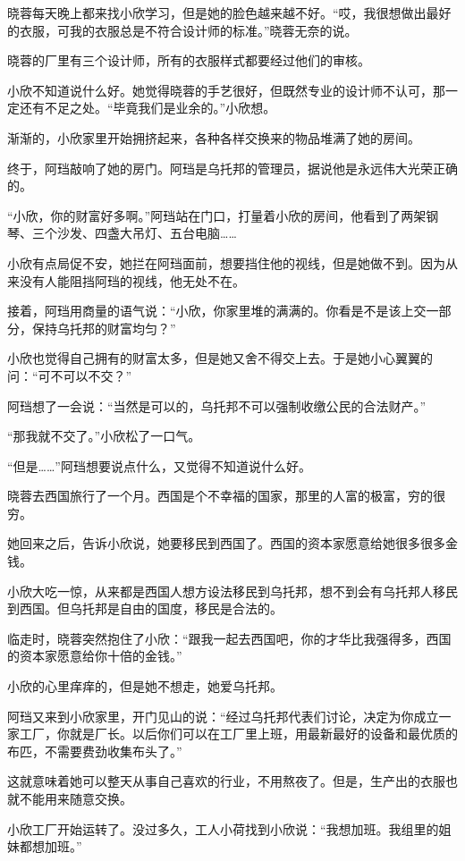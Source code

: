 晓蓉每天晚上都来找小欣学习，但是她的脸色越来越不好。“哎，我很想做出最好的衣服，可我的衣服总是不符合设计师的标准。”晓蓉无奈的说。

晓蓉的厂里有三个设计师，所有的衣服样式都要经过他们的审核。

小欣不知道说什么好。她觉得晓蓉的手艺很好，但既然专业的设计师不认可，那一定还有不足之处。“毕竟我们是业余的。”小欣想。

\zPar
渐渐的，小欣家里开始拥挤起来，各种各样交换来的物品堆满了她的房间。

终于，阿珰敲响了她的房门。阿珰是乌托邦的管理员，据说他是永远伟大光荣正确的。

“小欣，你的财富好多啊。”阿珰站在门口，打量着小欣的房间，他看到了两架钢琴、三个沙发、四盏大吊灯、五台电脑……

小欣有点局促不安，她拦在阿珰面前，想要挡住他的视线，但是她做不到。因为从来没有人能阻挡阿珰的视线，他无处不在。

接着，阿珰用商量的语气说：“小欣，你家里堆的满满的。你看是不是该上交一部分，保持乌托邦的财富均匀？”

小欣也觉得自己拥有的财富太多，但是她又舍不得交上去。于是她小心翼翼的问：“可不可以不交？”

阿珰想了一会说：“当然是可以的，乌托邦不可以强制收缴公民的合法财产。”

“那我就不交了。”小欣松了一口气。

“但是……”阿珰想要说点什么，又觉得不知道说什么好。

\zPar
晓蓉去西国旅行了一个月。西国是个不幸福的国家，那里的人富的极富，穷的很穷。

她回来之后，告诉小欣说，她要移民到西国了。西国的资本家愿意给她很多很多金钱。

小欣大吃一惊，从来都是西国人想方设法移民到乌托邦，想不到会有乌托邦人移民到西国。但乌托邦是自由的国度，移民是合法的。

临走时，晓蓉突然抱住了小欣：“跟我一起去西国吧，你的才华比我强得多，西国的资本家愿意给你十倍的金钱。”

小欣的心里痒痒的，但是她不想走，她爱乌托邦。

\zPar
阿珰又来到小欣家里，开门见山的说：“经过乌托邦代表们讨论，决定为你成立一家工厂，你就是厂长。以后你们可以在工厂里上班，用最新最好的设备和最优质的布匹，不需要费劲收集布头了。”

这就意味着她可以整天从事自己喜欢的行业，不用熬夜了。但是，生产出的衣服也就不能用来随意交换。

小欣工厂开始运转了。没过多久，工人小荷找到小欣说：“我想加班。我组里的姐妹都想加班。”


